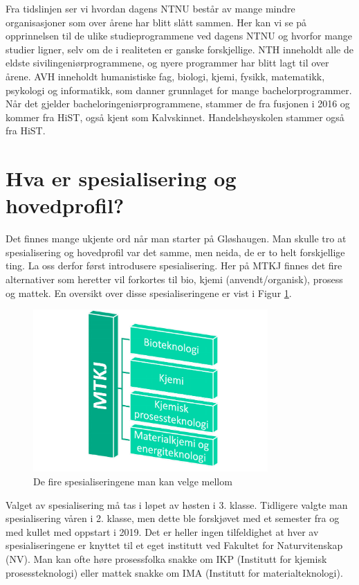 Fra tidslinjen ser vi hvordan dagens NTNU består av mange mindre organisasjoner som over årene har blitt slått sammen. Her kan vi se på opprinnelsen til de ulike studieprogrammene ved dagens NTNU og hvorfor mange studier ligner, selv om de i realiteten er ganske forskjellige. NTH inneholdt alle de eldste sivilingeniørprogrammene, og nyere programmer har blitt lagt til over årene. AVH inneholdt humanistiske fag, biologi, kjemi, fysikk, matematikk, psykologi og informatikk, som danner grunnlaget for mange bachelorprogrammer. Når det gjelder bacheloringeniørprogrammene, stammer de fra fusjonen i 2016 og kommer fra HiST, også kjent som Kalvskinnet. Handelshøyskolen stammer også fra HiST.

\section{Hva er spesialisering og hovedprofil?}

Det finnes mange ukjente ord når man starter på Gløshaugen. Man skulle tro at spesialisering og hovedprofil var det samme, men neida, de er to helt forskjellige ting. La oss derfor først introdusere spesialisering. Her på MTKJ finnes det fire alternativer som heretter vil forkortes til bio, kjemi (anvendt/organisk), prosess og mattek. En oversikt over disse spesialiseringene er vist i Figur \ref{fig:Spesialisering1}.


\begin{figure}[H]
    \centering
    \includegraphics[width=0.8\textwidth]{images/Retningsvalg.pdf}
    \caption{De fire spesialiseringene man kan velge mellom}
    \label{fig:Spesialisering1}
\end{figure}

Valget av spesialisering må tas i løpet av høsten i 3. klasse. Tidligere valgte man spesialisering våren i 2. klasse, men dette ble forskjøvet med et semester fra og med kullet med oppstart i 2019. Det er heller ingen tilfeldighet at hver av spesialiseringene er knyttet til et eget institutt ved Fakultet for Naturvitenskap (NV). Man kan ofte høre prosessfolka snakke om IKP (Institutt for kjemisk prosessteknologi) eller mattek snakke om IMA (Institutt for materialteknologi).

